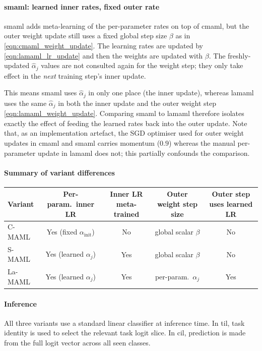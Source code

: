 \paragraph{\gls{smaml}: learned inner rates, fixed outer rate}

\gls{smaml} adds meta-learning of the per-parameter rates on top of \gls{cmaml}, but the outer weight update still uses a fixed global step size $\beta$ as in \eqref{eqn:cmaml_weight_update}. The learning rates are updated by \eqref{eqn:lamaml_lr_update} and then the weights are updated with $\beta$. The freshly-updated $\hat\alpha_j$ values are not consulted again for the weight step; they only take effect in the \emph{next} training step's inner update.

This means \gls{smaml} uses $\hat\alpha_j$ in only one place (the inner update), whereas \gls{lamaml} uses the same $\hat\alpha_j$ in both the inner update and the outer weight step \eqref{eqn:lamaml_weight_update}. Comparing \gls{smaml} to \gls{lamaml} therefore isolates exactly the effect of feeding the learned rates back into the outer update. Note that, as an implementation artefact, the SGD optimiser used for outer weight updates in \gls{cmaml} and \gls{smaml} carries momentum ($0.9$) whereas the manual per-parameter update in \gls{lamaml} does not; this partially confounds the comparison.

\paragraph{Summary of variant differences}

\begin{center}
\begin{tabular}{lcccc}
\hline
Variant & Per-param.\ inner LR & Inner LR meta-trained & Outer weight step size & Outer step uses learned LR \\
\hline
C-MAML  & Yes (fixed $\alpha_\text{init}$) & No  & global scalar $\beta$ & No \\
S-MAML  & Yes (learned $\alpha_j$)         & Yes & global scalar $\beta$ & No \\
La-MAML & Yes (learned $\alpha_j$)         & Yes & per-param.\ $\alpha_j$ & Yes \\
\hline
\end{tabular}
\end{center}

\paragraph{Inference}

All three variants use a standard linear classifier at inference time. In \gls{til}, task identity is used to select the relevant task logit slice. In \gls{cil}, prediction is made from the full logit vector across all seen classes.
